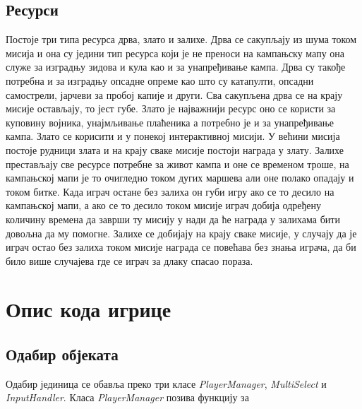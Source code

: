 \documentclass[11pt,a4paper]{report}
\begin{document}
\section{Ресурси}
Постоје три типа ресурса дрва, злато и залихе. Дрва се сакупљају из шума током мисија и она су једини тип ресурса који је не преноси на кампањску мапу она служе за изградњу зидова и кула као и за унапређивање кампа. Дрва су такође потребна и за изградњу опсадне опреме као што су катапулти, опсадни самострели, јарчеви за пробој капије и други. Сва сакупљена дрва се на крају мисије остављају, то јест губе. Злато је најважнији ресурс оно се користи за куповину војника, унајмљивање плаћеника а потребно је и за унапређивање кампа. Злато се корисити и у понекој интерактивној мисији. У већини мисија постоје рудници злата и на крају сваке мисије постоји награда у злату. Залихе престављају све ресурсе потребне за живот кампа и оне се временом троше, на кампањској мапи је то очигледно током дугих маршева али оне полако опадају и током битке. Када играч остане без залиха он губи игру ако се то десило на кампањској мапи, а ако се то десило током мисије играч добија одређену количину времена да заврши ту мисију у нади да ће награда у залихама бити довољна да му помогне. Залихе се добијају на крају сваке мисије, у случају да је играч остао без залиха током мисије награда се повећава без знања играча, да би било више случајева где се играч за длаку спасао пораза.

\chapter{Опис кода игрице}

\section{Одабир објеката}
Одабир јединица се обавља преко три класе \emph{PlayerManager}, \emph{MultiSelect} и \emph{InputHandler}. Класа \emph{PlayerManager} позива функцију за 
\end{document}
